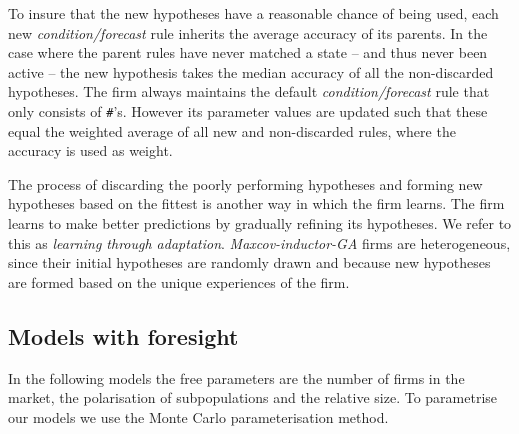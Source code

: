 \documentclass[preprint, 12pt]{elsarticle}
\begin{document}
To insure that the new hypotheses have a reasonable chance of being used, each new \emph{condition/forecast} rule inherits the average accuracy of its parents. In the case where the parent rules have never matched a state -- and thus never been active -- the new hypothesis takes the median accuracy of all the non-discarded hypotheses. The firm always maintains the default \emph{condition/forecast} rule that only consists of \texttt{\#}'s. However its parameter values are updated such that these equal the weighted average of all new and non-discarded rules, where the accuracy is used as weight.

The process of discarding the poorly performing hypotheses and forming new hypotheses based on the fittest is another way in which the firm learns. The firm learns to make better predictions by gradually refining its hypotheses. We refer to this as \emph{learning through adaptation}. \emph{Maxcov-inductor-GA} firms are heterogeneous, since their initial hypotheses are randomly drawn and because new hypotheses are formed based on the unique experiences of the firm.

\subsection{Models with foresight}

In the following models the free parameters are the number of firms in the market, the polarisation of subpopulations and the relative size. To parametrise our models we use the Monte Carlo parameterisation method. 
\end{document}
